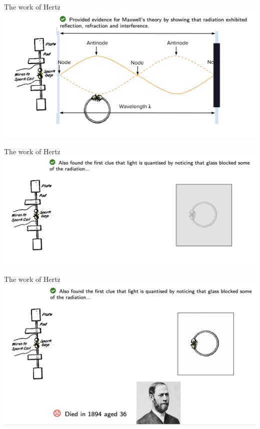 \begin{frame}{The work of Hertz}
\small
\includegraphics[scale=0.4]{hertz4}
\end{frame}

\begin{frame}{The work of Hertz}
\small
\includegraphics[scale=0.4]{hertz5}
\end{frame}

\begin{frame}{The work of Hertz}
\small
\includegraphics[scale=0.4]{hertz6}
\end{frame}


